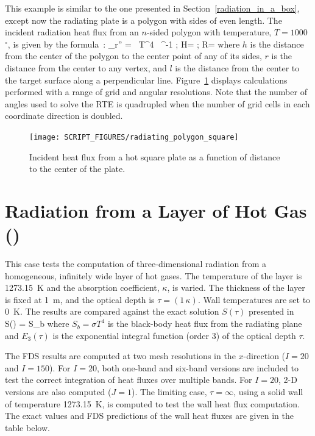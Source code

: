 \documentclass[11pt]{book}
\begin{document}
This example is similar to the one presented in Section~\ref{radiation_in_a_box}, except now the radiating plate is a polygon with sides of even length. The incident radiation heat flux from an $n$-sided polygon with temperature, $T=1000$~$^\circ$, is given by the formula~\cite{Siegel:1}:
\be
   \dq_{\rm r}'' = \sigma \, T^4 \,  \; \tan^{-1}  \quad ; \quad H= \quad ; \quad R=
\ee
where $h$ is the distance from the center of the polygon to the center point of any of its sides, $r$ is the distance from the center to any vertex, and $l$ is the distance from the center to the target surface along a perpendicular line. Figure~\ref{radiating_polygon_figure} displays calculations performed with a range of grid and angular resolutions. Note that the number of angles used to solve the RTE is quadrupled when the number of grid cells in each coordinate direction is doubled.

\begin{figure}[ht]
\centering
\texttt{[image: SCRIPT\_FIGURES/radiating\_polygon\_square]}
\caption[The {\ct radiating\_polygon} test case]{Incident heat flux from a hot square plate as a function of distance to the center of the plate.}
\label{radiating_polygon_figure}
\end{figure}



\section{Radiation from a Layer of Hot Gas (\texorpdfstring{}{radiation\_plane\_layer})}
\label{radiation_plane_layer}

This case tests the computation of three-dimensional radiation from a homogeneous, infinitely wide layer of hot gases.  The temperature of
the layer is 1273.15~K and the absorption coefficient, $\kappa$, is varied. The thickness of the layer is fixed at 1~m, and the optical depth is $\tau = (1 \, \kappa)$.
Wall temperatures are set to 0~K. The results are compared against the exact solution $S(\tau)$ presented in~\cite{Zeldovich:1}
\be S(\tau) = S_b \ee
where $S_b = \sigma T^4$ is the black-body heat flux from the radiating plane and $E_3(\tau)$ is the exponential
integral function (order 3) of the optical depth $\tau$.

The FDS results are computed at two mesh resolutions in the $x$-direction ($I=20$ and $I=150$). For $I=20$, both one-band and six-band versions are
included to test the correct integration of heat fluxes over multiple bands. For $I=20$, 2-D versions are also computed ($J=1$). The limiting case, $\tau=\infty$,
using a solid wall of temperature 1273.15~K, is computed to test the wall heat flux computation. The exact values and FDS predictions of
the wall heat fluxes are given in the table below.
\end{document}
